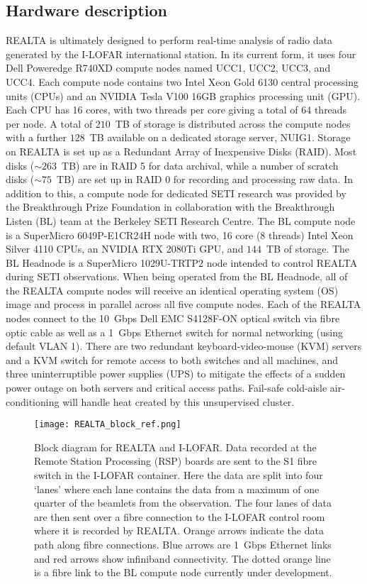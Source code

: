 \subsection{Hardware description}
REALTA is ultimately designed to perform real-time analysis of radio data generated by the I-LOFAR international station. In its current form, it uses four Dell Poweredge R740XD compute nodes named UCC1, UCC2, UCC3, and UCC4. Each compute node contains two Intel Xeon\textsuperscript{\textregistered} Gold 6130 central processing units (CPUs) and an NVIDIA Tesla V100 16GB graphics processing unit (GPU). Each CPU has 16 cores, with two threads per core giving a total of 64 threads per node.  A total of $210$~TB of storage is distributed across the compute nodes with a further $128$~TB available on a dedicated storage server, NUIG1. Storage on REALTA is set up as a Redundant Array of Inexpensive Disks (RAID). Most disks ($\sim 263$~TB) are in RAID 5 for data archival, while a number of scratch disks ($\sim 75$~TB) are set up in RAID 0 for recording and processing raw data. In addition to this, a compute node for dedicated SETI research was provided by the Breakthrough Prize Foundation in collaboration with the Breakthrough Listen (BL) team at the Berkeley SETI Research Centre. The BL compute node is a SuperMicro 6049P-E1CR24H node with two, 16 core (8 threads) Intel Xeon\textsuperscript{\textregistered} Silver 4110 CPUs, an NVIDIA RTX 2080Ti GPU, and $144$~TB of storage. The BL Headnode is a SuperMicro 1029U-TRTP2 node intended to control REALTA during SETI observations. When being operated from the BL Headnode, all of the REALTA compute nodes will receive an identical operating system (OS) image and process in parallel across all five compute nodes. Each of the REALTA nodes connect to the 10~Gbps Dell EMC S4128F-ON optical switch via fibre optic cable as well as a 1~Gbps Ethernet switch for normal networking (using default VLAN 1). There are two redundant keyboard-video-mouse (KVM) servers and a KVM switch for remote access to both switches and all machines, and three uninterruptible power supplies (UPS) to mitigate the effects of a sudden power outage on both servers and critical access paths. Fail-safe cold-aisle air-conditioning will handle heat created by this unsupervised cluster.

\begin{figure*}
    \centering
    \texttt{[image: REALTA\_block\_ref.png]}
    \caption[Block diagram for REALTA and I-LOFAR.]{Block diagram for REALTA and I-LOFAR. Data recorded at the Remote Station Processing (RSP) boards are sent to the S1 fibre switch in the I-LOFAR container. Here the data are split into four `lanes' where each lane contains the data from a maximum of one quarter of the beamlets from the observation. The four lanes of data are then sent over a fibre connection to the I-LOFAR control room where it is recorded by REALTA. Orange arrows indicate the data path along fibre connections. Blue arrows are 1~Gbps Ethernet links and red arrows show infiniband connectivity. The dotted orange line is a fibre link to the BL compute node currently under development.}
    \label{fig:block}
\end{figure*}

